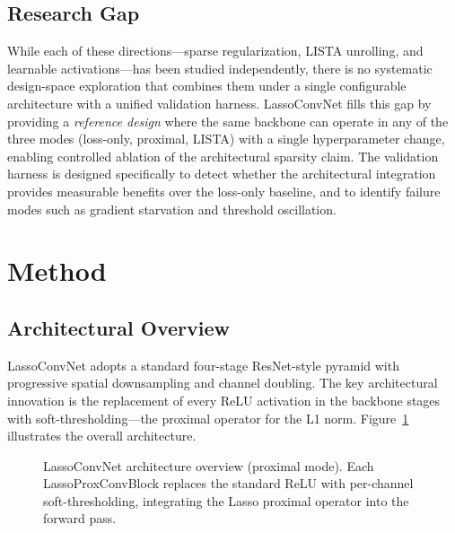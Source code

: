 \documentclass{article}
\begin{document}
\subsection{Research Gap}

While each of these directions---sparse regularization, LISTA unrolling, and
learnable activations---has been studied independently, there is no systematic
design-space exploration that combines them under a single configurable
architecture with a unified validation harness. LassoConvNet fills this gap
by providing a \emph{reference design} where the same backbone can operate in
any of the three modes (loss-only, proximal, LISTA) with a single
hyperparameter change, enabling controlled ablation of the architectural
sparsity claim. The validation harness is designed specifically to detect
whether the architectural integration provides measurable benefits over the
loss-only baseline, and to identify failure modes such as gradient starvation
and threshold oscillation.

\section{Method}
\label{sec:method}

\subsection{Architectural Overview}

LassoConvNet adopts a standard four-stage ResNet-style pyramid with progressive
spatial downsampling and channel doubling. The key architectural innovation is
the replacement of every ReLU activation in the backbone stages with
soft-thresholding---the proximal operator for the L1 norm. Figure~\ref{fig:arch}
illustrates the overall architecture.

\begin{figure}[h]
\centering
{}
\caption{LassoConvNet architecture overview (proximal mode). Each
LassoProxConvBlock replaces the standard ReLU with per-channel
soft-thresholding, integrating the Lasso proximal operator into the forward
pass.}\label{fig:arch}
\end{figure}
\end{document}
